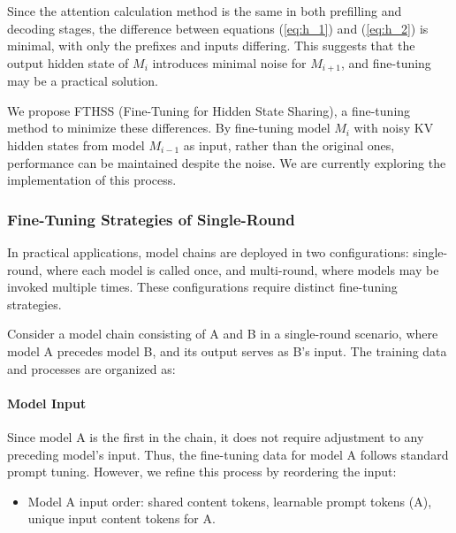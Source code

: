 Since the attention calculation method is the same in both prefilling and decoding stages, the difference between equations (\ref{eq:h_1}) and (\ref{eq:h_2}) is minimal, with only the prefixes and inputs differing. This suggests that the output hidden state of $M_{i}$ introduces minimal noise for $M_{i+1}$,
and fine-tuning may be a practical solution.

We propose FTHSS (Fine-Tuning for Hidden State Sharing), a fine-tuning method to minimize these differences. By fine-tuning model $M_i$ with noisy KV hidden states from model $M_{i-1}$ as input, rather than the original ones, performance can be maintained despite the noise. We are currently exploring the implementation of this process.


\subsubsection{Fine-Tuning Strategies of Single-Round}
In practical applications, model chains are deployed in two configurations: single-round, where each model is called once, and multi-round, where models may be invoked multiple times. These configurations require distinct fine-tuning strategies.

Consider a model chain consisting of  A and B in a single-round scenario, where model A precedes model B, and its output serves as B's input. The training data and processes are organized as:



\paragraph{Model Input}
Since model A is the first in the chain, it does not require adjustment to any preceding model's input. Thus, the fine-tuning data for model A follows standard prompt tuning. However, we refine this process by reordering the input:
\begin{itemize}
\item Model A input order: shared content tokens, learnable prompt tokens (A), unique input content tokens for A.
\end{itemize}

